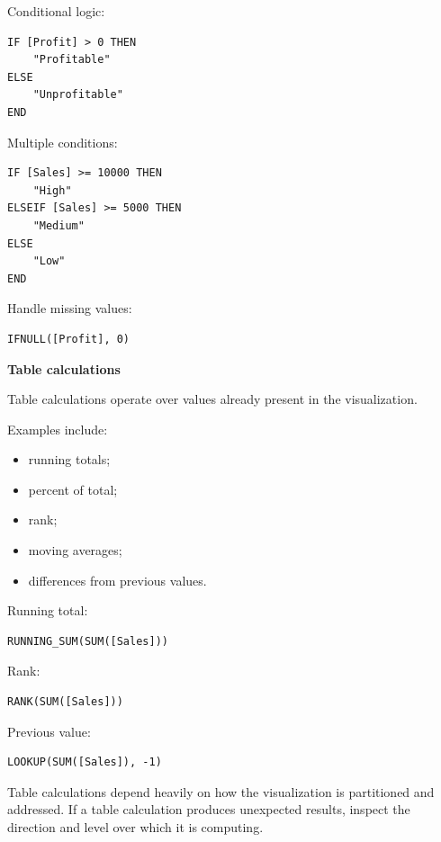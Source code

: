 \documentclass[11pt,letterpaper]{article}
\begin{document}
Conditional logic:

\begin{lstlisting}
IF [Profit] > 0 THEN
    "Profitable"
ELSE
    "Unprofitable"
END
\end{lstlisting}

Multiple conditions:

\begin{lstlisting}
IF [Sales] >= 10000 THEN
    "High"
ELSEIF [Sales] >= 5000 THEN
    "Medium"
ELSE
    "Low"
END
\end{lstlisting}

Handle missing values:

\begin{lstlisting}
IFNULL([Profit], 0)
\end{lstlisting}



\textbf{Table calculations}

Table calculations operate over values already present in the visualization.

Examples include:

\begin{itemize}[leftmargin=*]
    \item running totals;
    \item percent of total;
    \item rank;
    \item moving averages;
    \item differences from previous values.
\end{itemize}

Running total:

\begin{lstlisting}
RUNNING_SUM(SUM([Sales]))
\end{lstlisting}

Rank:

\begin{lstlisting}
RANK(SUM([Sales]))
\end{lstlisting}

Previous value:

\begin{lstlisting}
LOOKUP(SUM([Sales]), -1)
\end{lstlisting}

Table calculations depend heavily on how the visualization is partitioned and
addressed. If a table calculation produces unexpected results, inspect the
direction and level over which it is computing.
\end{document}

